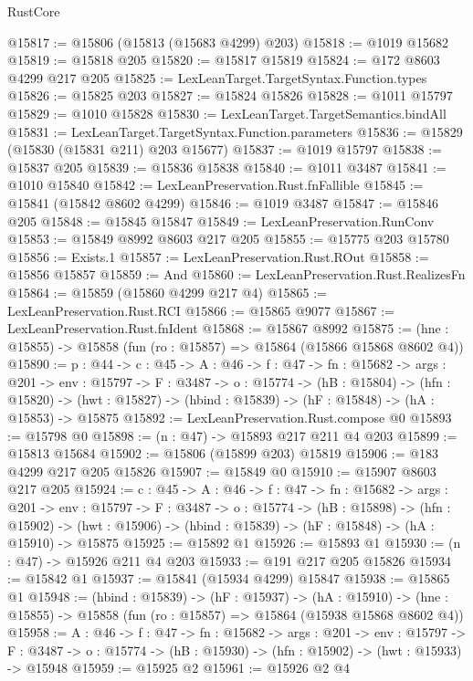 \begin{lexlean}{RustCore}
\begin{coremodule}
@15817 := @15806 (@15813 (@15683 @4299) @203)
@15818 := @1019 @15682
@15819 := @15818 @205
@15820 := @15817 @15819
@15824 := @172 @8603 @4299 @217 @205
@15825 := LexLeanTarget.TargetSyntax.Function.types
@15826 := @15825 @203
@15827 := @15824 @15826
@15828 := @1011 @15797
@15829 := @1010 @15828
@15830 := LexLeanTarget.TargetSemantics.bindAll
@15831 := LexLeanTarget.TargetSyntax.Function.parameters
@15836 := @15829 (@15830 (@15831 @211) @203 @15677)
@15837 := @1019 @15797
@15838 := @15837 @205
@15839 := @15836 @15838
@15840 := @1011 @3487
@15841 := @1010 @15840
@15842 := LexLeanPreservation.Rust.fnFallible
@15845 := @15841 (@15842 @8602 @4299)
@15846 := @1019 @3487
@15847 := @15846 @205
@15848 := @15845 @15847
@15849 := LexLeanPreservation.RunConv
@15853 := @15849 @8992 @8603 @217 @205
@15855 := @15775 @203 @15780
@15856 := Exists.{1}
@15857 := LexLeanPreservation.Rust.ROut
@15858 := @15856 @15857
@15859 := And
@15860 := LexLeanPreservation.Rust.RealizesFn
@15864 := @15859 (@15860 @4299 @217 @4)
@15865 := LexLeanPreservation.Rust.RCI
@15866 := @15865 @9077
@15867 := LexLeanPreservation.Rust.fnIdent
@15868 := @15867 @8992
@15875 := (hne : @15855) -> @15858 (fun (ro : @15857) => @15864 (@15866 @15868 @8602 @4))
@15890 := {p : @44} ->
  {c : @45} ->
  {A : @46} ->
  {f : @47} ->
  {fn : @15682} ->
  {args : @201} ->
  {env : @15797} ->
  {F : @3487} ->
  {o : @15774} ->
  (hB : @15804) ->
  (hfn : @15820) -> (hwt : @15827) -> (hbind : @15839) -> (hF : @15848) -> (hA : @15853) -> @15875
@15892 := LexLeanPreservation.Rust.compose @0
@15893 := @15798 @0
@15898 := (n : @47) -> @15893 @217 @211 @4 @203
@15899 := @15813 @15684
@15902 := @15806 (@15899 @203) @15819
@15906 := @183 @4299 @217 @205 @15826
@15907 := @15849 @0
@15910 := @15907 @8603 @217 @205
@15924 := {c : @45} ->
  {A : @46} ->
  {f : @47} ->
  {fn : @15682} ->
  {args : @201} ->
  {env : @15797} ->
  {F : @3487} ->
  {o : @15774} ->
  (hB : @15898) ->
  (hfn : @15902) -> (hwt : @15906) -> (hbind : @15839) -> (hF : @15848) -> (hA : @15910) -> @15875
@15925 := @15892 @1
@15926 := @15893 @1
@15930 := (n : @47) -> @15926 @211 @4 @203
@15933 := @191 @217 @205 @15826
@15934 := @15842 @1
@15937 := @15841 (@15934 @4299) @15847
@15938 := @15865 @1
@15948 := (hbind : @15839) ->
  (hF : @15937) ->
  (hA : @15910) -> (hne : @15855) -> @15858 (fun (ro : @15857) => @15864 (@15938 @15868 @8602 @4))
@15958 := {A : @46} ->
  {f : @47} ->
  {fn : @15682} ->
  {args : @201} ->
  {env : @15797} ->
  {F : @3487} -> {o : @15774} -> (hB : @15930) -> (hfn : @15902) -> (hwt : @15933) -> @15948
@15959 := @15925 @2
@15961 := @15926 @2 @4

\end{coremodule}
\end{lexlean}
